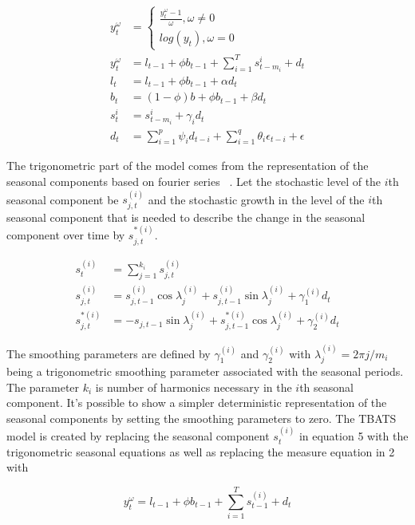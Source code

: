\documentclass{article}\usepackage[]{graphicx}\usepackage[]{color}
\theoremstyle{definition}
\begin{document}
\begin{align}
y_t^{\omega} &= \begin{cases} 
    \frac{y_t^{\omega} - 1}{\omega}, \omega \ne 0\\
    log(y_t), \omega = 0
    \end{cases}\\
y_t^{\omega} &= l_{t-1} + \phi b_{t-1} + \sum_{i=1}^T s_{t-m_i}^i + d_t\\
l_t &= l_{t-1} + \phi b_{t-1} + \alpha d_t \\
b_t &= (1-\phi)b + \phi b_{t-1} + \beta d_t \\
s_t^i &= s_{t-m_i}^i + \gamma_i d_t \\
d_t &= \sum_{i=1}^p \psi_i d_{t-i} + \sum_{i=1}^q \theta_i \epsilon_{t-i} + \epsilon
\end{align}

The trigonometric part of the model comes from the representation of the seasonal components based on fourier series ~\cite{fourierTrans}. Let the stochastic level of the $i$th seasonal component be $s_{j,t}^{(i)}$ and the stochastic growth in the level of the $i$th seasonal component that is needed to describe the change in the seasonal component over time by $s_{j,t}^{*(i)}$. 

\begin{align}
s_t^{(i)} &= \sum_{j=1}^{k_i} s_{j,t}^{(i)}\\
s_{j,t}^{(i)} &= s_{j,t-1}^{(i)} \cos\lambda_j^{(i)} + s_{j,t-1}^{(i)}\sin\lambda_j^{(i)} + \gamma_1^{(i)}d_t\\
s_{j,t}^{*(i)} &= -s_{j,t-1} \sin\lambda_j^{(i)} + s_{j,t-1}^{*(i)}\cos\lambda_j^{(i)} + \gamma_2^{(i)}d_t
\end{align}

The smoothing parameters are defined by $\gamma_1^{(i)}$ and $\gamma_2^{(i)}$ with $\lambda_j^{(i)} = 2\pi j/m_i$ being a trigonometric smoothing parameter associated with the seasonal periods. The parameter $k_i$ is number of harmonics necessary in the $i$th seasonal component. It's possible to show a simpler deterministic representation of the seasonal components by setting the smoothing parameters to zero. The TBATS model is created by replacing the seasonal component $s_t^{(i)}$ in equation 5 with the trigonometric seasonal equations as well as replacing the measure equation in 2 with 

\begin{equation}
y_t^{\omega} = l_{t-1} + \phi b_{t-1} + \sum_{i=1}^T s_{t-1}^{(i)} + d_t
\end{equation}
\end{document}
